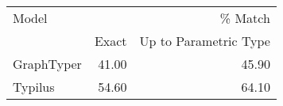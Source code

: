 \begin{tabular}{lrr}
\toprule
Model & \multicolumn{2}{r}{\% Match} \\
 & Exact & Up to Parametric Type \\
\midrule
GraphTyper & 41.00 & 45.90 \\
Typilus & 54.60 & 64.10 \\
\bottomrule
\end{tabular}


